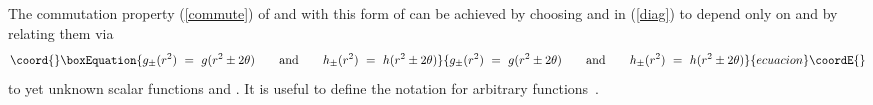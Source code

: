 \documentclass[a4paper,11pt,english]{article}
\numberwithin{equation}{section}
\renewcommand{\=}{\ =\ }
\begin{document}
The commutation property (\ref{commute}) of \coordHE{} and \coordHE{} with this form of \coordHE{} 
can be achieved by choosing \coordHE{} and \coordHE{} in (\ref{diag})
to depend only on \coordHE{} and by relating them via
\begin{equation}\coord{}\boxEquation{
 g_\pm(r^2)\=g(r^2\pm 2\theta) \qquad\text{and}\qquad
 h_\pm(r^2)\=h(r^2\pm 2\theta)
}{
 g_\pm(r^2)\=g(r^2\pm 2\theta) \qquad\text{and}\qquad
 h_\pm(r^2)\=h(r^2\pm 2\theta)
}{ecuacion}\coordE{}\end{equation}
to yet unknown scalar functions \coordHE{} and \coordHE{}.
It is useful to define the notation \coordHE{}
for arbitrary functions~\coordHE{}.
\end{document}
